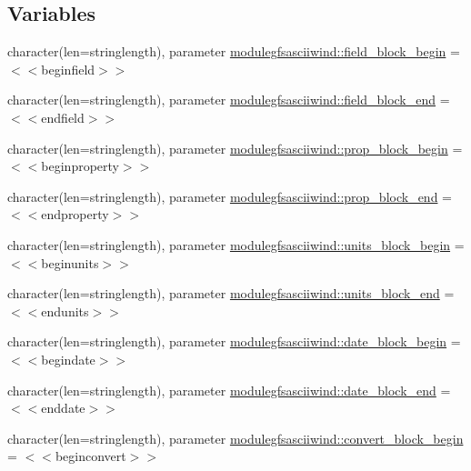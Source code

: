 \subsection*{Variables}
\begin{DoxyCompactItemize}
\item 
character(len=stringlength), parameter \mbox{\hyperlink{namespacemodulegfsasciiwind_a2c0745dc6b808be5890234478059c603}{modulegfsasciiwind\+::field\+\_\+block\+\_\+begin}} = \textquotesingle{}$<$$<$beginfield$>$$>$\textquotesingle{}
\item 
character(len=stringlength), parameter \mbox{\hyperlink{namespacemodulegfsasciiwind_ae8d1dc361028c3693336bb732fc2a502}{modulegfsasciiwind\+::field\+\_\+block\+\_\+end}} = \textquotesingle{}$<$$<$endfield$>$$>$\textquotesingle{}
\item 
character(len=stringlength), parameter \mbox{\hyperlink{namespacemodulegfsasciiwind_a036d03f90ca62e80e383e0817e415089}{modulegfsasciiwind\+::prop\+\_\+block\+\_\+begin}} = \textquotesingle{}$<$$<$beginproperty$>$$>$\textquotesingle{}
\item 
character(len=stringlength), parameter \mbox{\hyperlink{namespacemodulegfsasciiwind_a239295586e75d8d91ccab74434e29581}{modulegfsasciiwind\+::prop\+\_\+block\+\_\+end}} = \textquotesingle{}$<$$<$endproperty$>$$>$\textquotesingle{}
\item 
character(len=stringlength), parameter \mbox{\hyperlink{namespacemodulegfsasciiwind_af4903f24bfb8c26bad841c76f24ffc97}{modulegfsasciiwind\+::units\+\_\+block\+\_\+begin}} = \textquotesingle{}$<$$<$beginunits$>$$>$\textquotesingle{}
\item 
character(len=stringlength), parameter \mbox{\hyperlink{namespacemodulegfsasciiwind_ab88fa85792b55aff45b9916708cf12ae}{modulegfsasciiwind\+::units\+\_\+block\+\_\+end}} = \textquotesingle{}$<$$<$endunits$>$$>$\textquotesingle{}
\item 
character(len=stringlength), parameter \mbox{\hyperlink{namespacemodulegfsasciiwind_a0f313fac62779d173ef39b9aeaf5ee0d}{modulegfsasciiwind\+::date\+\_\+block\+\_\+begin}} = \textquotesingle{}$<$$<$begindate$>$$>$\textquotesingle{}
\item 
character(len=stringlength), parameter \mbox{\hyperlink{namespacemodulegfsasciiwind_a7d76704d4672bd7af3a050e4dae08735}{modulegfsasciiwind\+::date\+\_\+block\+\_\+end}} = \textquotesingle{}$<$$<$enddate$>$$>$\textquotesingle{}
\item 
character(len=stringlength), parameter \mbox{\hyperlink{namespacemodulegfsasciiwind_a2fdc105a5e66cf54be832babc014ca26}{modulegfsasciiwind\+::convert\+\_\+block\+\_\+begin}} = \textquotesingle{}$<$$<$beginconvert$>$$>$\textquotesingle{}

\end{DoxyCompactItemize}

